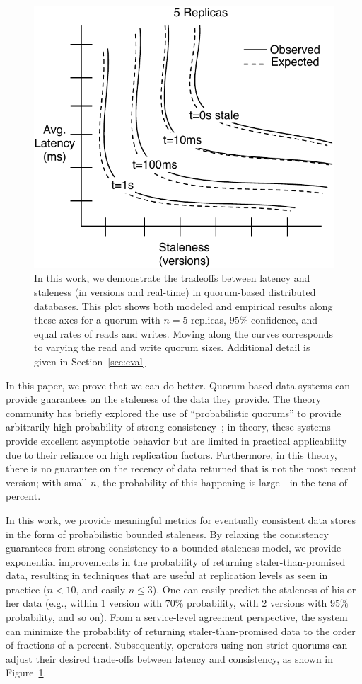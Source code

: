 \documentclass{vldb}
\begin{document}
\begin{figure}
\includegraphics[width=.8\columnwidth]{figs/latency-stale.pdf}
\caption{In this work, we demonstrate the tradeoffs between latency
  and staleness (in versions and real-time) in quorum-based
  distributed databases.  This plot shows both modeled and empirical
  results along these axes for a quorum with $n=5$ replicas, $95\%$
  confidence, and equal rates of reads and writes. Moving along the
  curves corresponds to varying the read and write quorum
  sizes. Additional detail is given in Section~\ref{sec:eval}}
\label{fig:latency-staleness}
\end{figure}

In this paper, we prove that we can do better. Quorum-based data systems
can provide guarantees on the staleness of the data they provide. The
theory community has briefly explored the use of ``probabilistic
quorums'' to provide arbitrarily high probability of strong
consistency~\cite{prob-quorum}; in theory, these systems provide
excellent asymptotic behavior but are limited in practical
applicability due to their reliance on high replication factors.
Furthermore, in this theory, there is no guarantee on the recency of
data returned that is not the most recent version; with small $n$,
the probability of this happening is large---in the tens of percent.

In this work, we provide meaningful metrics for eventually consistent
data stores in the form of probabilistic bounded staleness.  By
relaxing the consistency guarantees from strong consistency to a
bounded-staleness model, we provide exponential improvements in the
probability of returning staler-than-promised data, resulting in
techniques that are useful at replication levels as seen in practice
($n<10$, and easily $n\leq3$).  One can easily predict the staleness
of his or her data (e.g., within 1 version with $70\%$ probability,
with 2 versions with $95\%$ probability, and so on).  From a
service-level agreement perspective, the system can minimize the
probability of returning staler-than-promised data to the order of
fractions of a percent.  Subsequently, operators using non-strict
quorums can adjust their desired trade-offs between latency and
consistency, as shown in Figure~\ref{fig:latency-staleness}.
\end{document}
